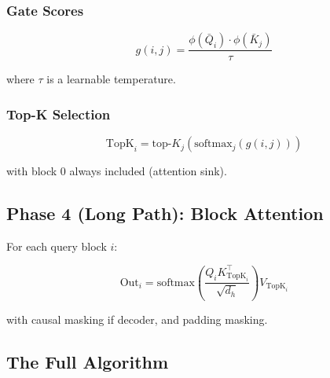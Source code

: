 \subsubsection{Gate Scores}

\[
g(i, j) = \frac{\phi(\bar{Q}_i) \cdot \phi(\bar{K}_j)}{\tau}
\tag{4.6}
\]

where $\tau$ is a learnable temperature.

\subsubsection{Top-K Selection}

\[
\text{TopK}_i = \text{top-}K_{j}(\text{softmax}_j(g(i, j)))
\tag{4.7}
\]

with block 0 always included (attention sink).

\subsection{Phase 4 (Long Path): Block Attention}

For each query block $i$:

\[
\text{Out}_i = \text{softmax}\!\left(\frac{Q_i K_{\text{TopK}_i}^\top}{\sqrt{d_h}}\right) V_{\text{TopK}_i}
\tag{4.8}
\]

with causal masking if decoder, and padding masking.

\subsection{The Full Algorithm}

